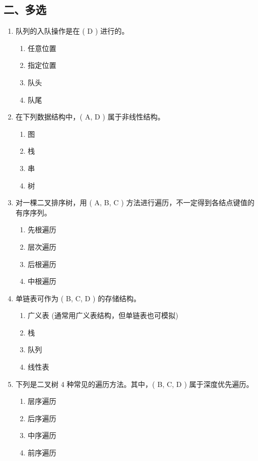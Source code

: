 \documentclass[12pt, a4paper]{article}
\begin{document}
\subsection*{二、多选}

\begin{enumerate}[label=\arabic*.]
    \item 队列的入队操作是在 ( D ) 进行的。
    \begin{enumerate}
        \item 任意位置
        \item 指定位置
        \item 队头
        \item 队尾
    \end{enumerate}

    \item 在下列数据结构中，( A, D ) 属于非线性结构。
    \begin{enumerate}
        \item 图
        \item 栈
        \item 串
        \item 树
    \end{enumerate}

    \item 对一棵二叉排序树，用 ( A, B, C ) 方法进行遍历，不一定得到各结点键值的有序序列。
    \begin{enumerate}
        \item 先根遍历
        \item 层次遍历
        \item 后根遍历
        \item 中根遍历
    \end{enumerate}

    \item 单链表可作为 ( B, C, D ) 的存储结构。
    \begin{enumerate}
        \item 广义表 (通常用广义表结构，但单链表也可模拟)
        \item 栈
        \item 队列
        \item 线性表
    \end{enumerate}

    \item 下列是二叉树 4 种常见的遍历方法。其中，( B, C, D ) 属于深度优先遍历。
    \begin{enumerate}
        \item 层序遍历
        \item 后序遍历
        \item 中序遍历
        \item 前序遍历
    \end{enumerate}
\end{enumerate}
\end{document}
